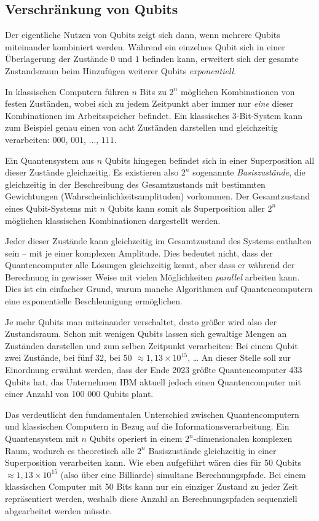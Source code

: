 \subsection{Verschränkung von Qubits}
\label{subsec:verschraenkungQubits}

Der eigentliche Nutzen von Qubits zeigt sich dann, wenn mehrere Qubits miteinander kombiniert werden. Während ein einzelnes Qubit sich in einer Überlagerung der Zustände \(0\) und \(1\) befinden kann, erweitert sich der gesamte Zustandsraum beim Hinzufügen weiterer Qubits \emph{exponentiell}.

In klassischen Computern führen \(n\) Bits zu \(2^n\) möglichen Kombinationen von festen Zuständen, wobei sich zu jedem Zeitpunkt aber immer nur \emph{eine} dieser Kombinationen im Arbeitsspeicher befindet. Ein klassisches 3-Bit-System kann zum Beispiel genau einen von acht Zuständen darstellen und gleichzeitig verarbeiten: \(000\), \(001\), ..., \(111\).

Ein Quantensystem aus \(n\) Qubits hingegen befindet sich in einer Superposition all dieser Zustände gleichzeitig. Es existieren also \(2^n\) sogenannte \emph{Basiszustände}, die gleichzeitig in der Beschreibung des Gesamtzustands mit bestimmten Gewichtungen (Wahrscheinlichkeitsamplituden) vorkommen. Der Gesamtzustand eines Qubit-Systems mit \(n\) Qubits kann somit als Superposition aller \(2^n\) möglichen klassischen Kombinationen dargestellt werden.

Jeder dieser Zustände kann gleichzeitig im Gesamtzustand des Systems enthalten sein – mit je einer komplexen Amplitude. Dies bedeutet nicht, dass der Quantencomputer alle Lösungen gleichzeitig kennt, aber dass er während der Berechnung in gewisser Weise mit vielen Möglichkeiten \emph{parallel} arbeiten kann. Dies ist ein einfacher Grund, warum manche Algorithmen auf Quantencomputern eine exponentielle Beschleunigung ermöglichen.

Je mehr Qubits man miteinander verschaltet, desto größer wird also der Zustandsraum. Schon mit wenigen Qubits lassen sich gewaltige Mengen an Zuständen darstellen und zum selben Zeitpunkt verarbeiten: Bei einem Qubit zwei Zustände, bei fünf 32, bei 50 \(\approx 1{,}13 \times 10^{15}\), \dots
An dieser Stelle soll zur Einordnung erwähnt werden, dass der Ende 2023 größte Quantencomputer 433 Qubits hat, das Unternehmen IBM aktuell jedoch einen Quantencomputer mit einer Anzahl von 100 000 Qubits plant.

Das verdeutlicht den fundamentalen Unterschied zwischen Quantencomputern und klassischen Computern in Bezug auf die Informationsverarbeitung. Ein Quantensystem mit $n$ Qubits operiert in einem $2^n$-dimensionalen komplexen Raum, wodurch es theoretisch alle $2^n$ Basiszustände gleichzeitig in einer Superposition verarbeiten kann. Wie eben aufgeführt wären dies für 50 Qubits \(\approx 1{,}13 \times 10^{15}\) (also über eine Billiarde) simultane Berechnungspfade. Bei einem klassischen Computer mit 50 Bits kann nur ein einziger Zustand zu jeder Zeit repräsentiert werden, weshalb diese Anzahl an Berechnungspfaden sequenziell abgearbeitet werden müsste.

